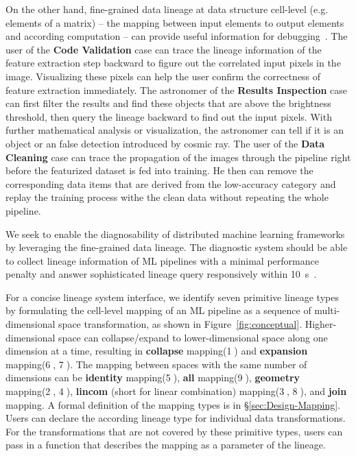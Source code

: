 \documentclass{sig-alternate}
\begin{document}
On the other hand, fine-grained data lineage at data structure cell-level (e.g. elements of a matrix) -- the mapping between
input elements to output elements and according computation -- can provide useful information for
debugging~\cite{widom04}. The user of the {\bf Code Validation} case can trace the lineage
information of the feature extraction step backward to figure out the correlated input pixels in the image. Visualizing
these pixels can help the user confirm the correctness of feature extraction immediately. 
The astronomer of the {\bf Results Inspection}
case can first filter the results and find these objects that are above the brightness threshold, then query the lineage
backward to find out the input pixels. With further mathematical analysis or visualization, the astronomer can tell
if it is an object or an false detection introduced by cosmic ray. 
The user of the {\bf Data Cleaning} case can trace the propagation of the images through the pipeline right before
the featurized dataset is fed into training. He then can remove the corresponding data items that are derived from
the low-accuracy category and replay the training process withe the clean data without repeating the whole pipeline.

We seek to enable the diagnosability of distributed machine learning frameworks by leveraging the fine-grained data lineage.
The diagnostic system should be able to collect lineage information of ML pipelines with a minimal performance penalty and
answer sophisticated lineage query responsively within 10~s~\cite{nielsen2009}.


For a concise lineage system interface, we identify seven primitive lineage types by formulating the cell-level mapping 
of an ML pipeline as a sequence of multi-dimensional space transformation, as shown in Figure~\ref{fig:conceptual}.
Higher-dimensional space can collapse/expand to lower-dimensional space along one dimension at a time, 
resulting in {\bf collapse} mapping(\textcircled{1}) and {\bf expansion} mapping(\textcircled{6}, \textcircled{7}). 
The mapping between spaces with the same number of dimensions can be {\bf identity} mapping(\textcircled{5}), {\bf all} mapping(\textcircled{9}), 
{\bf geometry} mapping(\textcircled{2}, \textcircled{4}), {\bf lincom} (short for linear combination) mapping(\textcircled{3}, \textcircled{8}),
and {\bf join} mapping.
A formal definition of the mapping types is in \S\ref{sec:Design-Mapping}.
Users can declare the according lineage type for individual data transformations.
For the transformations that are not covered by these primitive types, users can pass in a function that describes the
mapping as a parameter of the lineage.
\end{document}

